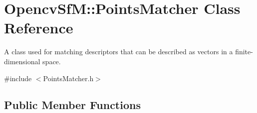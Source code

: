 \hypertarget{class_opencv_sf_m_1_1_points_matcher}{
\section{OpencvSfM::PointsMatcher Class Reference}
\label{class_opencv_sf_m_1_1_points_matcher}
}


A class used for matching descriptors that can be described as vectors in a finite-\/dimensional space.  




{\ttfamily \#include $<$PointsMatcher.h$>$}

\subsection*{Public Member Functions}

